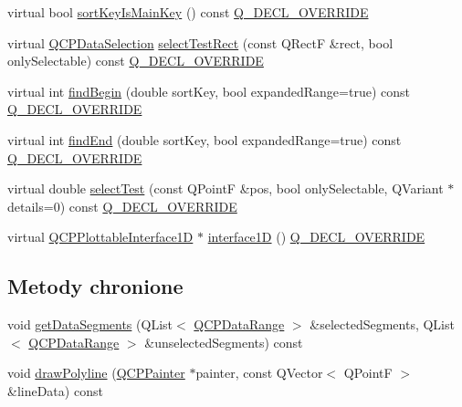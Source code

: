 \begin{DoxyCompactItemize}
\item 
virtual bool \hyperlink{class_q_c_p_abstract_plottable1_d_afe0d56e39cc076032922f059b304c092}{sort\+Key\+Is\+Main\+Key} () const \hyperlink{qcustomplot_8hh_a42cc5eaeb25b85f8b52d2a4b94c56f55}{Q\+\_\+\+D\+E\+C\+L\+\_\+\+O\+V\+E\+R\+R\+I\+DE}
\item 
virtual \hyperlink{class_q_c_p_data_selection}{Q\+C\+P\+Data\+Selection} \hyperlink{class_q_c_p_abstract_plottable1_d_a22377bf6e57ab7eedbc9e489250c6ded}{select\+Test\+Rect} (const Q\+RectF \&rect, bool only\+Selectable) const \hyperlink{qcustomplot_8hh_a42cc5eaeb25b85f8b52d2a4b94c56f55}{Q\+\_\+\+D\+E\+C\+L\+\_\+\+O\+V\+E\+R\+R\+I\+DE}
\item 
virtual int \hyperlink{class_q_c_p_abstract_plottable1_d_ad0b46d25cde3d035b180fb8f10c056e6}{find\+Begin} (double sort\+Key, bool expanded\+Range=true) const \hyperlink{qcustomplot_8hh_a42cc5eaeb25b85f8b52d2a4b94c56f55}{Q\+\_\+\+D\+E\+C\+L\+\_\+\+O\+V\+E\+R\+R\+I\+DE}
\item 
virtual int \hyperlink{class_q_c_p_abstract_plottable1_d_a6e3ba20c9160d7361e58070390d10b1a}{find\+End} (double sort\+Key, bool expanded\+Range=true) const \hyperlink{qcustomplot_8hh_a42cc5eaeb25b85f8b52d2a4b94c56f55}{Q\+\_\+\+D\+E\+C\+L\+\_\+\+O\+V\+E\+R\+R\+I\+DE}
\item 
virtual double \hyperlink{class_q_c_p_abstract_plottable1_d_a4611b43bcb6441b2154eb4f4e0a33db2}{select\+Test} (const Q\+PointF \&pos, bool only\+Selectable, Q\+Variant $\ast$details=0) const \hyperlink{qcustomplot_8hh_a42cc5eaeb25b85f8b52d2a4b94c56f55}{Q\+\_\+\+D\+E\+C\+L\+\_\+\+O\+V\+E\+R\+R\+I\+DE}
\item 
virtual \hyperlink{class_q_c_p_plottable_interface1_d}{Q\+C\+P\+Plottable\+Interface1D} $\ast$ \hyperlink{class_q_c_p_abstract_plottable1_d_ac58fb47bfe330f6931ed8e64326387d7}{interface1D} () \hyperlink{qcustomplot_8hh_a42cc5eaeb25b85f8b52d2a4b94c56f55}{Q\+\_\+\+D\+E\+C\+L\+\_\+\+O\+V\+E\+R\+R\+I\+DE}
\end{DoxyCompactItemize}
\subsection*{Metody chronione}
\begin{DoxyCompactItemize}
\item 
void \hyperlink{class_q_c_p_abstract_plottable1_d_a966cb165fb1dfc561d923dc6f8b149ea}{get\+Data\+Segments} (Q\+List$<$ \hyperlink{class_q_c_p_data_range}{Q\+C\+P\+Data\+Range} $>$ \&selected\+Segments, Q\+List$<$ \hyperlink{class_q_c_p_data_range}{Q\+C\+P\+Data\+Range} $>$ \&unselected\+Segments) const 
\item 
void \hyperlink{class_q_c_p_abstract_plottable1_d_afcc3d512b172721356003a318e0e4c88}{draw\+Polyline} (\hyperlink{class_q_c_p_painter}{Q\+C\+P\+Painter} $\ast$painter, const Q\+Vector$<$ Q\+PointF $>$ \&line\+Data) const 
\end{DoxyCompactItemize}
